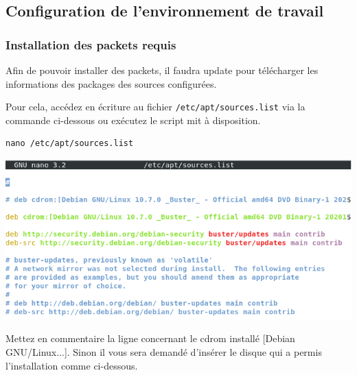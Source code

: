 \documentclass[12pt,a4paper]{article}
\newcommand{\code}[1]{\colorbox{light-gray}{\texttt{#1}}}
\begin{document}
\begin{flushleft}
       \subsection{Configuration de l'environnement de travail}
       
      
        \subsubsection{Installation des packets requis}
       \item Afin de pouvoir installer des packets, il faudra update pour télécharger les informations des packages des sources configurées. 
       \item Pour cela, accédez en écriture au fichier \code{/etc/apt/sources.list} via la commande ci-dessous ou exécutez le script mit à disposition.

       \begin{lstlisting}
nano /etc/apt/sources.list
       \end{lstlisting}      

       \begin{center}
            \includegraphics[scale=0.6]{sources.list}
        \end{center}
        
       \item Mettez en commentaire la ligne concernant le cdrom installé [Debian GNU/Linux...]. Sinon il vous sera demandé d'insérer le disque qui a permis l'installation comme ci-dessous.             


\end{flushleft}
\end{document}
